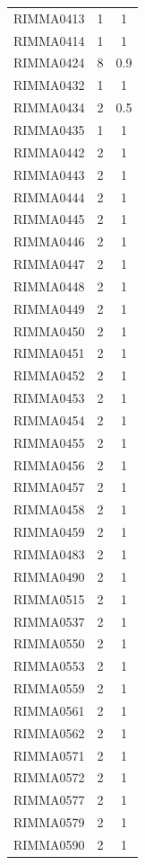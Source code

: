 \documentclass[11pt]{article}
\begin{document}
\begin{linenumbers}
\begin{flushleft}
\begin{table}[htbp]
\begin{tabular}{ccc}
    RIMMA0413 & 1     & 1 \\
    RIMMA0414 & 1     & 1 \\
    RIMMA0424 & 8     & 0.9 \\
    RIMMA0432 & 1     & 1 \\
    RIMMA0434 & 2     & 0.5 \\
    RIMMA0435 & 1     & 1 \\
    RIMMA0442 & 2     & 1 \\
    RIMMA0443 & 2     & 1 \\
    RIMMA0444 & 2     & 1 \\
    RIMMA0445 & 2     & 1 \\
    RIMMA0446 & 2     & 1 \\
    RIMMA0447 & 2     & 1 \\
    RIMMA0448 & 2     & 1 \\
    RIMMA0449 & 2     & 1 \\
    RIMMA0450 & 2     & 1 \\
    RIMMA0451 & 2     & 1 \\
    RIMMA0452 & 2     & 1 \\
    RIMMA0453 & 2     & 1 \\
    RIMMA0454 & 2     & 1 \\
    RIMMA0455 & 2     & 1 \\
    RIMMA0456 & 2     & 1 \\
    RIMMA0457 & 2     & 1 \\
    RIMMA0458 & 2     & 1 \\
    RIMMA0459 & 2     & 1 \\
    RIMMA0483 & 2     & 1 \\
    RIMMA0490 & 2     & 1 \\
    RIMMA0515 & 2     & 1 \\
    RIMMA0537 & 2     & 1 \\
    RIMMA0550 & 2     & 1 \\
    RIMMA0553 & 2     & 1 \\
    RIMMA0559 & 2     & 1 \\
    RIMMA0561 & 2     & 1 \\
    RIMMA0562 & 2     & 1 \\
    RIMMA0571 & 2     & 1 \\
    RIMMA0572 & 2     & 1 \\
    RIMMA0577 & 2     & 1 \\
    RIMMA0579 & 2     & 1 \\
    RIMMA0590 & 2     & 1 \\

\end{tabular}
\end{table}
\end{flushleft}
\end{linenumbers}
\end{document}
